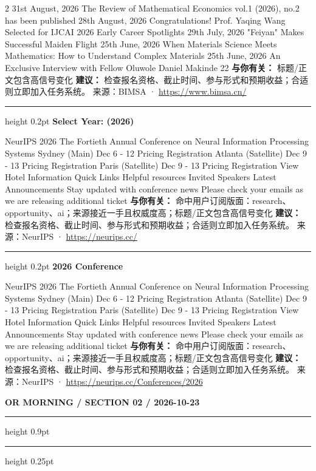 \documentclass[10.5pt]{ctexart}
\begin{document}
\begin{multicols}{2}
31st August, 2026 The Review of Mathematical Economics vol.1 (2026), no.2 has been published 28th August, 2026 Congratulations! Prof. Yaqing Wang Selected for IJCAI 2026 Early Career Spotlights 29th July, 2026 "Feiyan" Makes Successful Maiden Flight 25th June, 2026 When Materials Science Meets Mathematics: How to Understand Complex Materials 25th June, 2026 An Exclusive Interview with Fellow Oluwole Daniel Makinde 22
\textbf{与你有关：} 标题/正文包含高信号变化
\textbf{建议：} 检查报名资格、截止时间、参与形式和预期收益；合适则立即加入任务系统。
{\footnotesize\color{ormuted} 来源：BIMSA · \url{https://www.bimsa.cn/}}
\vspace{2mm}
\hrule height 0.2pt
\vspace{2mm}
{\large\bfseries Select Year: (2026)}\par
NeurIPS 2026 The Fortieth Annual Conference on Neural Information Processing Systems Sydney (Main) Dec 6 - 12 Pricing Registration Atlanta (Satellite) Dec 9 - 13 Pricing Registration Paris (Satellite) Dec 9 - 13 Pricing Registration View Hotel Information Quick Links Helpful resources Invited Speakers Latest Announcements Stay updated with conference news Please check your emails as we are releasing additional ticket
\textbf{与你有关：} 命中用户订阅版面：research、opportunity、ai；来源接近一手且权威度高；标题/正文包含高信号变化
\textbf{建议：} 检查报名资格、截止时间、参与形式和预期收益；合适则立即加入任务系统。
{\footnotesize\color{ormuted} 来源：NeurIPS · \url{https://neurips.cc/}}
\vspace{2mm}
\hrule height 0.2pt
\vspace{2mm}
{\large\bfseries 2026 Conference}\par
NeurIPS 2026 The Fortieth Annual Conference on Neural Information Processing Systems Sydney (Main) Dec 6 - 12 Pricing Registration Atlanta (Satellite) Dec 9 - 13 Pricing Registration Paris (Satellite) Dec 9 - 13 Pricing Registration View Hotel Information Quick Links Helpful resources Invited Speakers Latest Announcements Stay updated with conference news Please check your emails as we are releasing additional ticket
\textbf{与你有关：} 命中用户订阅版面：research、opportunity、ai；来源接近一手且权威度高；标题/正文包含高信号变化
\textbf{建议：} 检查报名资格、截止时间、参与形式和预期收益；合适则立即加入任务系统。
{\footnotesize\color{ormuted} 来源：NeurIPS · \url{https://neurips.cc/Conferences/2026}}
\end{multicols}
\newpage
{\small\bfseries OR MORNING / SECTION 02 / 2026-10-23}
\vspace{2mm}
\hrule height 0.9pt
\vspace{1.5mm}
\hrule height 0.25pt
\vspace{4mm}
\end{document}
